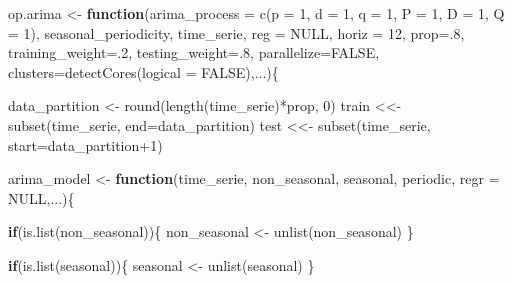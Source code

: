 \documentclass[
]{article}
\newenvironment{Shaded}{\begin{snugshade}}{\end{snugshade}}
\newcommand{\AttributeTok}[1]{\textcolor[rgb]{0.77,0.63,0.00}{#1}}
\newcommand{\ConstantTok}[1]{\textcolor[rgb]{0.00,0.00,0.00}{#1}}
\newcommand{\ControlFlowTok}[1]{\textcolor[rgb]{0.13,0.29,0.53}{\textbf{#1}}}
\newcommand{\DecValTok}[1]{\textcolor[rgb]{0.00,0.00,0.81}{#1}}
\newcommand{\FunctionTok}[1]{\textcolor[rgb]{0.00,0.00,0.00}{#1}}
\newcommand{\NormalTok}[1]{#1}
\newcommand{\OtherTok}[1]{\textcolor[rgb]{0.56,0.35,0.01}{#1}}
\newcommand{\SpecialCharTok}[1]{\textcolor[rgb]{0.00,0.00,0.00}{#1}}
\begin{document}
\begin{Shaded}
\begin{Highlighting}[]
\NormalTok{op.arima }\OtherTok{\textless{}{-}} \ControlFlowTok{function}\NormalTok{(}\AttributeTok{arima\_process =} \FunctionTok{c}\NormalTok{(}\AttributeTok{p =} \DecValTok{1}\NormalTok{, }\AttributeTok{d =} \DecValTok{1}\NormalTok{, }\AttributeTok{q =} \DecValTok{1}\NormalTok{,}
                                       \AttributeTok{P =} \DecValTok{1}\NormalTok{, }\AttributeTok{D =} \DecValTok{1}\NormalTok{, }\AttributeTok{Q =} \DecValTok{1}\NormalTok{),}
\NormalTok{                     seasonal\_periodicity,}
\NormalTok{                     time\_serie, }\AttributeTok{reg =} \ConstantTok{NULL}\NormalTok{, }\AttributeTok{horiz =} \DecValTok{12}\NormalTok{,}
                     \AttributeTok{prop=}\NormalTok{.}\DecValTok{8}\NormalTok{, }\AttributeTok{training\_weight=}\NormalTok{.}\DecValTok{2}\NormalTok{, }\AttributeTok{testing\_weight=}\NormalTok{.}\DecValTok{8}\NormalTok{,}
                     \AttributeTok{parallelize=}\ConstantTok{FALSE}\NormalTok{,}
                     \AttributeTok{clusters=}\FunctionTok{detectCores}\NormalTok{(}\AttributeTok{logical =} \ConstantTok{FALSE}\NormalTok{),...)\{}

\NormalTok{    data\_partition }\OtherTok{\textless{}{-}} \FunctionTok{round}\NormalTok{(}\FunctionTok{length}\NormalTok{(time\_serie)}\SpecialCharTok{*}\NormalTok{prop, }\DecValTok{0}\NormalTok{)}
\NormalTok{    train }\OtherTok{\textless{}\textless{}{-}} \FunctionTok{subset}\NormalTok{(time\_serie, }\AttributeTok{end=}\NormalTok{data\_partition)}
\NormalTok{    test }\OtherTok{\textless{}\textless{}{-}} \FunctionTok{subset}\NormalTok{(time\_serie, }\AttributeTok{start=}\NormalTok{data\_partition}\SpecialCharTok{+}\DecValTok{1}\NormalTok{)}

\NormalTok{    arima\_model }\OtherTok{\textless{}{-}} \ControlFlowTok{function}\NormalTok{(time\_serie, non\_seasonal, seasonal, periodic, }
                            \AttributeTok{regr =} \ConstantTok{NULL}\NormalTok{,...)\{}

        \ControlFlowTok{if}\NormalTok{(}\FunctionTok{is.list}\NormalTok{(non\_seasonal))\{}
\NormalTok{            non\_seasonal }\OtherTok{\textless{}{-}} \FunctionTok{unlist}\NormalTok{(non\_seasonal)}
\NormalTok{        \}}

        \ControlFlowTok{if}\NormalTok{(}\FunctionTok{is.list}\NormalTok{(seasonal))\{}
\NormalTok{            seasonal }\OtherTok{\textless{}{-}} \FunctionTok{unlist}\NormalTok{(seasonal)}
\NormalTok{        \}}


\end{Highlighting}
\end{Shaded}
\end{document}
